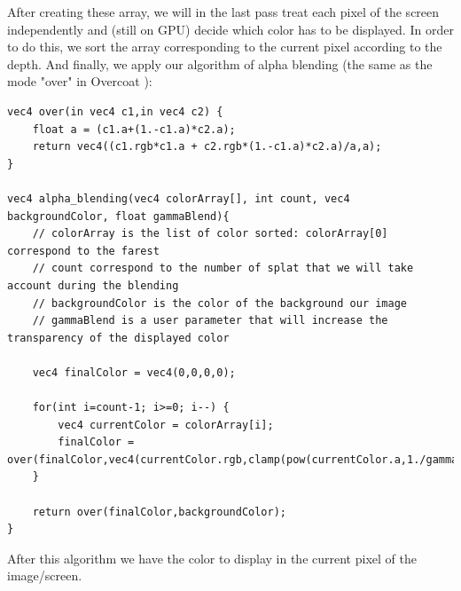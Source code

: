 After creating these array, we will in the last pass treat each pixel of the screen independently and (still on GPU) decide which color has to be displayed. In order to do this, we sort the array corresponding to the current pixel according to the depth. And finally, we apply our algorithm of alpha blending (the same as the mode "over" in Overcoat \cite{schmid_overcoat:_2011}):



\lstset{escapechar=@,style=customc}

\begin{lstlisting}
vec4 over(in vec4 c1,in vec4 c2) {
    float a = (c1.a+(1.-c1.a)*c2.a);
    return vec4((c1.rgb*c1.a + c2.rgb*(1.-c1.a)*c2.a)/a,a);
}

vec4 alpha_blending(vec4 colorArray[], int count, vec4 backgroundColor, float gammaBlend){
    // colorArray is the list of color sorted: colorArray[0] correspond to the farest
    // count correspond to the number of splat that we will take account during the blending
    // backgroundColor is the color of the background our image
    // gammaBlend is a user parameter that will increase the transparency of the displayed color

    vec4 finalColor = vec4(0,0,0,0);

    for(int i=count-1; i>=0; i--) {
        vec4 currentColor = colorArray[i];
        finalColor = over(finalColor,vec4(currentColor.rgb,clamp(pow(currentColor.a,1./gammaBlend),0.,1.)));
    }

    return over(finalColor,backgroundColor);
}
\end{lstlisting}

After this algorithm we have the color to display in the current pixel of the image/screen.



